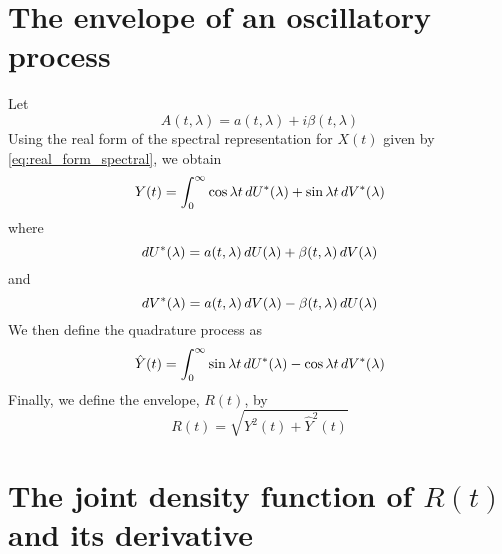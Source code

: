 \documentclass{article}
\begin{document}
\section{The envelope of an oscillatory process}

Let
\begin{equation}
  \label{eq:complex_a} A (t, \lambda) = a (t, \lambda) + i \beta (t, \lambda)
\end{equation}
Using the real form of the spectral representation for $X (t)$ given by
\ref{eq:real_form_spectral}, we obtain
\begin{equation}
  \label{eq:real_form_y} Y (t) = \int_0^{\infty} \cos \lambda t
  \hspace{0.17em} dU^{\ast} (\lambda) + \sin \lambda t \hspace{0.17em}
  dV^{\ast} (\lambda)
\end{equation}
where
\begin{equation}
  \label{eq:du_star} dU^{\ast} (\lambda) = a (t, \lambda)  \hspace{0.17em} dU
  (\lambda) + \beta (t, \lambda)  \hspace{0.17em} dV (\lambda)
\end{equation}
and
\begin{equation}
  \label{eq:dv_star} dV^{\ast} (\lambda) = a (t, \lambda)  \hspace{0.17em} dV
  (\lambda) - \beta (t, \lambda)  \hspace{0.17em} dU (\lambda)
\end{equation}
We then define the quadrature process as
\begin{equation}
  \label{eq:quadrature_y} \hat{Y} (t) = \int_0^{\infty} \sin \lambda t
  \hspace{0.17em} dU^{\ast} (\lambda) - \cos \lambda t \hspace{0.17em}
  dV^{\ast} (\lambda)
\end{equation}
Finally, we define the envelope, $R (t)$, by
\begin{equation}
  \label{eq:envelope_r} R (t) = \sqrt{Y^2 (t) + \hat{Y}^2 (t)}
\end{equation}

\section{The joint density function of $R (t)$ and its derivative}
\end{document}
